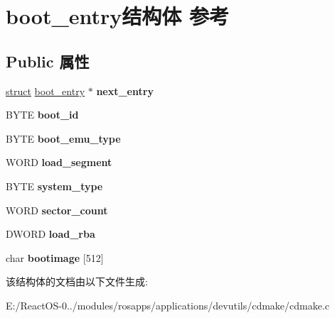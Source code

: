 \hypertarget{structboot__entry}{}\section{boot\+\_\+entry结构体 参考}
\label{structboot__entry}
\subsection*{Public 属性}
\begin{DoxyCompactItemize}
\item 
\mbox{\label{structboot__entry_abf30aff3e928b1c1447269b83d18709b}} 
\hyperlink{interfacestruct}{struct} \hyperlink{structboot__entry}{boot\+\_\+entry} $\ast$ {\bfseries next\+\_\+entry}
\item 
\mbox{\label{structboot__entry_ad964e1a505a5693498ec8356bfcfd4e3}} 
B\+Y\+TE {\bfseries boot\+\_\+id}
\item 
\mbox{\label{structboot__entry_a43f59e4d3baf93a8e0258b9267adf80b}} 
B\+Y\+TE {\bfseries boot\+\_\+emu\+\_\+type}
\item 
\mbox{\label{structboot__entry_a49e2d7943beadc54fb3ee8ca34c2dc80}} 
W\+O\+RD {\bfseries load\+\_\+segment}
\item 
\mbox{\label{structboot__entry_a2d29481e77d2ae7e0f47593d993894a5}} 
B\+Y\+TE {\bfseries system\+\_\+type}
\item 
\mbox{\label{structboot__entry_ac0aaac2915b68424da5fee17ddfc5307}} 
W\+O\+RD {\bfseries sector\+\_\+count}
\item 
\mbox{\label{structboot__entry_a2f0ffe3e04106bbaf88a2e64407f329b}} 
D\+W\+O\+RD {\bfseries load\+\_\+rba}
\item 
\mbox{\label{structboot__entry_a31e67481671d583beae3449cf22270bf}} 
char {\bfseries bootimage} \mbox{[}512\mbox{]}
\end{DoxyCompactItemize}


该结构体的文档由以下文件生成\+:\begin{DoxyCompactItemize}
\item 
E\+:/\+React\+O\+S-\/0../modules/rosapps/applications/devutils/cdmake/cdmake.\+c\end{DoxyCompactItemize}
